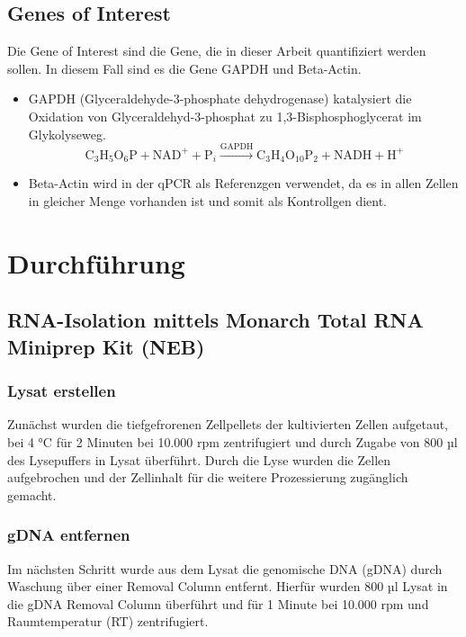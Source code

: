 \documentclass{article}
\begin{document}
\subsection*{Genes of Interest}
Die Gene of Interest sind die Gene, die in dieser Arbeit quantifiziert
werden sollen. In diesem Fall sind es die Gene GAPDH und Beta-Actin.
\begin{itemize}
    \item GAPDH (Glyceraldehyde-3-phosphate dehydrogenase) katalysiert die 
    Oxidation von Glyceraldehyd-3-phosphat zu
    1,3-Bisphosphoglycerat im Glykolyseweg.
\[
\text{C}_3\text{H}_5\text{O}_6\text{P} + \text{NAD}^+ + \text{P}_i \xrightarrow{\text{GAPDH}} \text{C}_3\text{H}_4\text{O}_{10}\text{P}_2 + \text{NADH} + \text{H}^+
\]

    \item Beta-Actin wird in der qPCR als Referenzgen verwendet, da es in allen
    Zellen in gleicher Menge vorhanden ist und somit als Kontrollgen dient.
    
\end{itemize}


\section{Durchführung}

\subsection{RNA-Isolation mittels Monarch\textsuperscript{\textregistered} Total RNA Miniprep Kit (NEB)}

\subsubsection*{Lysat erstellen}
Zunächst wurden die tiefgefrorenen
Zellpellets der kultivierten Zellen aufgetaut,
bei 4 °C für 2 Minuten bei 10.000 rpm zentrifugiert
und durch Zugabe von 800 µl des Lysepuffers in Lysat überführt.
Durch die Lyse wurden die Zellen aufgebrochen
und der Zellinhalt für die weitere Prozessierung zugänglich gemacht.

\subsubsection*{gDNA entfernen}
Im nächsten Schritt wurde aus dem Lysat die
genomische DNA (gDNA) durch Waschung über einer Removal Column entfernt.
Hierfür wurden 800 µl Lysat in die gDNA Removal Column überführt und für
1 Minute bei 10.000 rpm und Raumtemperatur (RT) zentrifugiert.
\end{document}
